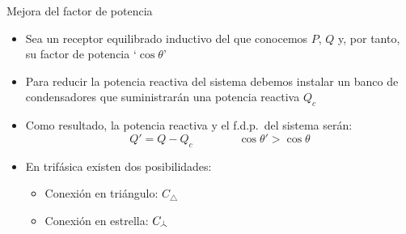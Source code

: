 \documentclass[aspectratio=169, usenames,svgnames,dvipsnames]{beamer}
\newcommand\wye{\scalerel*{\stackengine{-1pt}{%
  \rotatebox[origin=c]{30}{\rule{10pt}{.9pt}}\kern-1pt%
  \rotatebox[origin=c]{-30}{\rule{10pt}{1.3pt}}}{%
  \rule{.9pt}{10pt}}{O}{c}{F}{F}{S}}{\Delta}} %
\begin{document}
\begin{frame}{Mejora del factor de potencia}
    \begin{itemize}
        \item Sea un \alert{receptor equilibrado} \alert{inductivo} del que conocemos \(P\), \(Q\) y, por tanto, su factor de potencia `\(\cos \theta\)'

        \vspace{4mm}
        \item Para reducir la potencia reactiva del sistema debemos instalar un \alert{banco de condensadores} que suministrarán una potencia reactiva \(Q_c\)

        \vspace{4mm}
        \item Como resultado, la \alert{potencia reactiva} y el \alert{f.d.p.}~del sistema serán:         
        \[
            Q' = Q - Q_c  \qquad\qquad \cos\theta' > \cos \theta
        \]

        \vspace{1mm}
        \item En trifásica existen \alert{dos posibilidades}:
        
        \vspace{1mm}
        \begin{itemize}
            \normalsize
            \item Conexión en triángulo: \hspace{3mm}\(C_{\triangle}\)
            
            \vspace{2mm}
            \item Conexión en estrella: \hspace{3mm}\(C_{\wye}\)
        \end{itemize}
    \end{itemize}
\end{frame}

\end{document}
